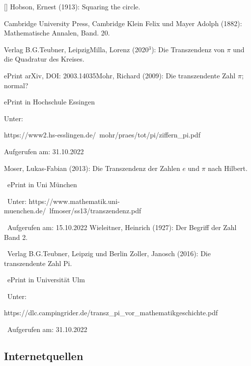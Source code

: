[\HobsonInt] Hobson, Ernest (1913): Squaring the circle. \par  Cambridge University Press, Cambridge \newline\newline
[\AnnalenInt] Klein Felix und Mayer Adolph (1882): Mathematische Annalen, Band. 20. \par Verlag B.G.Teubner, Leipzig\newline\newline[\MillaInt] Milla, Lorenz (2020$^3$): Die Transzendenz von \(\pi\) und die Quadratur des Kreises. \par
ePrint arXiv, DOI: 2003.14035\newline\newline
[\MohrInt] Mohr, Richard (2009): Die transzendente Zahl \(\pi\); normal? \par ePrint in Hochschule Essingen \par Unter:\begin{simplechar} https://www2.hs-esslingen.de/~mohr/praes/tot/pi/ziffern_pi.pdf \par Aufgerufen am: 31.10.2022\end{simplechar} \newline\newline
[\MoserInt] Moser, Lukas-Fabian (2013): Die Transzendenz der Zahlen $e$ und $\pi$ nach
Hilbert. \par\, ePrint in Uni München \par\, Unter: https://www.mathematik.uni-muenchen.de/~lfmoser/ss13/transzendenz.pdf \par\, Aufgerufen am: 15.10.2022\newline\newline
\newpage\noindent[\WieleitnerInt] Wieleitner, Heinrich (1927): Der Begriff der Zahl Band 2. \par\, Verlag B.G.Teubner, Leipzig und Berlin \newline\newline
[\PiUlm] Zoller, Janosch (2016): Die transzendente Zahl Pi. \par\, ePrint in Universität Ulm \par\, Unter: \begin{simplechar}
    https://dlc.campingrider.de/transz_pi_vor_mathematikgeschichte.pdf
\end{simplechar} \par\, Aufgerufen am: 31.10.2022\subsection{Internetquellen}
